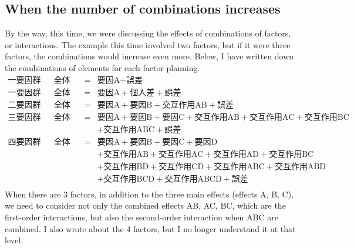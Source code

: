 \documentclass{ltjbook}
\begin{document}
\subsection{When the number of combinations increases}
By the way, this time, we were discussing the effects of combinations of factors, or interactions. The example this time involved two factors, but if it were three factors, the combinations would increase even more. Below, I have written down the combinations of elements for each factor planning.
\[
	\begin{array}{llll}
		\mbox{一要因群間計画} & \mbox{全体変動} & = & \mbox{要因A} + \mbox{誤差}                                                          \\
		\mbox{一要因群内計画} & \mbox{全体変動} & = & \mbox{要因A} + \mbox{個人差} + \mbox{誤差}                                             \\
		\mbox{二要因群間計画} & \mbox{全体変動} & = & \mbox{要因A} + \mbox{要因B} +\mbox{交互作用AB} +\mbox{誤差}                               \\
		\mbox{三要因群間計画} & \mbox{全体変動} & = & \mbox{要因A} + \mbox{要因B} + \mbox{要因C}+\mbox{交互作用AB} +\mbox{交互作用AC}+\mbox{交互作用BC} \\
		               &             &   & +\mbox{交互作用ABC}  +\mbox{誤差}                                                     \\
		\mbox{四要因群間計画} & \mbox{全体変動} & = & \mbox{要因A} + \mbox{要因B} + \mbox{要因C} + \mbox{要因D}                               \\
		               &             &   & + \mbox{交互作用AB} +\mbox{交互作用AC} +\mbox{交互作用AD}+\mbox{交互作用BC}                     \\
		               &             &   & +\mbox{交互作用BD} +\mbox{交互作用CD}+\mbox{交互作用ABC}+\mbox{交互作用ABD}                     \\
		               &             &   & +\mbox{交互作用BCD} +\mbox{交互作用ABCD} +\mbox{誤差}                                     \\
	\end{array}
\]
When there are 3 factors, in addition to the three main effects (effects A, B, C), we need to consider not only the combined effects AB, AC, BC, which are the first-order interactions, but also the second-order interaction when ABC are combined. I also wrote about the 4 factors, but I no longer understand it at that level.
\end{document}
